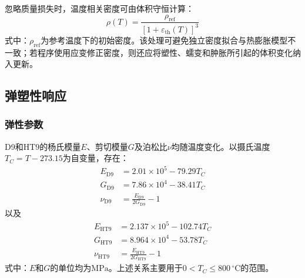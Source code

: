 忽略质量损失时，温度相关密度可由体积守恒计算：
\begin{equation}
	\rho(T)
	=\frac{\rho_{\mathrm{ref}}}
	{\left[1+\varepsilon_{\mathrm{th}}(T)\right]^3}
	\label{eq:clad_density_from_thermal_strain}
\end{equation}
\noindent 式中：$\rho_{\mathrm{ref}}$为参考温度下的初始密度。该处理可避免独立密度拟合与热膨胀模型不一致；若程序使用应变修正密度，则还应将塑性、蠕变和肿胀所引起的体积变化纳入更新。

\subsection{弹塑性响应}
\label{sec:cladding_elastoplastic_response}

\subsubsection{弹性参数}

D9和HT9的杨氏模量$E$、剪切模量$G$及泊松比$\nu$均随温度变化\cite{hofmanMetallicFuelsHandbook2019}。以摄氏温度$T_C=T-273.15$为自变量，存在：
\begin{subequations}\label{eq:d9_elastic_properties}
	\begin{align}
		E_{\mathrm{D9}}&=2.01\times10^5-79.29T_C
		\label{eq:d9_youngs_modulus}\\
		G_{\mathrm{D9}}&=7.86\times10^4-38.41T_C
		\label{eq:d9_shear_modulus}\\
		\nu_{\mathrm{D9}}&=\frac{E_{\mathrm{D9}}}{2G_{\mathrm{D9}}}-1
		\label{eq:d9_poisson_ratio}
	\end{align}
\end{subequations}
以及
\begin{subequations}\label{eq:ht9_elastic_properties}
	\begin{align}
		E_{\mathrm{HT9}}&=2.137\times10^5-102.74T_C
		\label{eq:ht9_youngs_modulus}\\
		G_{\mathrm{HT9}}&=8.964\times10^4-53.78T_C
		\label{eq:ht9_shear_modulus}\\
		\nu_{\mathrm{HT9}}&=\frac{E_{\mathrm{HT9}}}{2G_{\mathrm{HT9}}}-1
		\label{eq:ht9_poisson_ratio}
	\end{align}
\end{subequations}
\noindent 式中：$E$和$G$的单位均为$\mathrm{MPa}$。上述关系主要用于$0<T_C\leq800\,{}^\circ\mathrm{C}$的范围。


